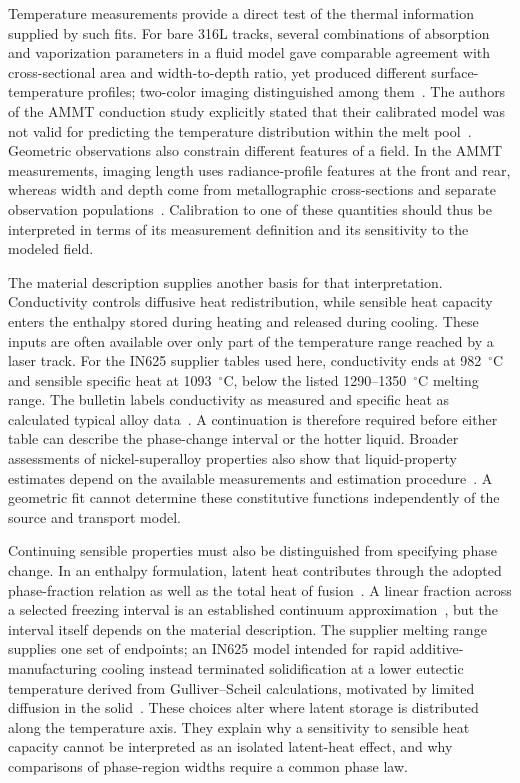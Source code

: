 Temperature measurements provide a direct test of the thermal information supplied by such fits. For bare 316L tracks, several combinations of absorption and vaporization parameters in a fluid model gave comparable agreement with cross-sectional area and width-to-depth ratio, yet produced different surface-temperature profiles; two-color imaging distinguished among them~\cite{myers2023}. The authors of the AMMT conduction study explicitly stated that their calibrated model was not valid for predicting the temperature distribution within the melt pool~\cite{kollmannsberger2019}. Geometric observations also constrain different features of a field. In the AMMT measurements, imaging length uses radiance-profile features at the front and rear, whereas width and depth come from metallographic cross-sections and separate observation populations~\cite{lane2020}. Calibration to one of these quantities should thus be interpreted in terms of its measurement definition and its sensitivity to the modeled field.

The material description supplies another basis for that interpretation. Conductivity controls diffusive heat redistribution, while sensible heat capacity enters the enthalpy stored during heating and released during cooling. These inputs are often available over only part of the temperature range reached by a laser track. For the IN625 supplier tables used here, conductivity ends at 982~$^\circ$C and sensible specific heat at 1093~$^\circ$C, below the listed 1290--1350~$^\circ$C melting range. The bulletin labels conductivity as measured and specific heat as calculated typical alloy data~\cite{specialmetals625}. A continuation is therefore required before either table can describe the phase-change interval or the hotter liquid. Broader assessments of nickel-superalloy properties also show that liquid-property estimates depend on the available measurements and estimation procedure~\cite{mills2006}. A geometric fit cannot determine these constitutive functions independently of the source and transport model.

Continuing sensible properties must also be distinguished from specifying phase change. In an enthalpy formulation, latent heat contributes through the adopted phase-fraction relation as well as the total heat of fusion~\cite{vanelsen2007}. A linear fraction across a selected freezing interval is an established continuum approximation~\cite{dynamic2024}, but the interval itself depends on the material description. The supplier melting range supplies one set of endpoints; an IN625 model intended for rapid additive-manufacturing cooling instead terminated solidification at a lower eutectic temperature derived from Gulliver--Scheil calculations, motivated by limited diffusion in the solid~\cite{specialmetals625,dynamic2024}. These choices alter where latent storage is distributed along the temperature axis. They explain why a sensitivity to sensible heat capacity cannot be interpreted as an isolated latent-heat effect, and why comparisons of phase-region widths require a common phase law.

